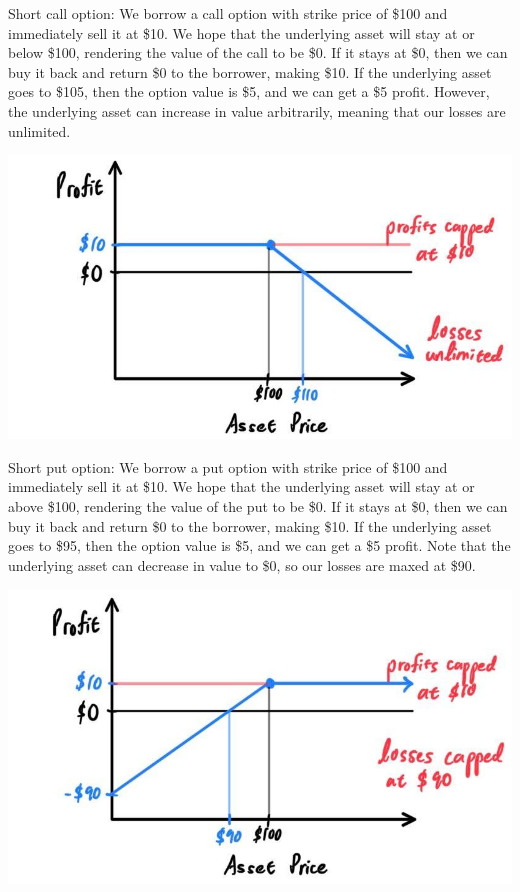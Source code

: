 \documentclass{article}
\begin{document}
\begin{definition}
Short call option: We borrow a call option with strike price of \$100 and immediately sell it at \$10. We hope that the underlying asset will stay at or below \$100, rendering the value of the call to be \$0. If it stays at \$0, then we can buy it back and return \$0 to the borrower, making \$10. If the underlying asset goes to \$105, then the option value is \$5, and we can get a \$5 profit. However, the underlying asset can increase in value arbitrarily, meaning that our losses are unlimited. 
\begin{center}
    \includegraphics[scale=0.3]{img/short_call.jpg}
\end{center}
\end{definition}

\begin{definition}
Short put option: We borrow a put option with strike price of \$100 and immediately sell it at \$10. We hope that the underlying asset will stay at or above \$100, rendering the value of the put to be \$0. If it stays at \$0, then we can buy it back and return \$0 to the borrower, making \$10. If the underlying asset goes to \$95, then the option value is \$5, and we can get a \$5 profit. Note that the underlying asset can decrease in value to \$0, so our losses are maxed at \$90. 
\begin{center}
    \includegraphics[scale=0.3]{img/short_put.jpg}
\end{center}
\end{definition}
\end{document}
